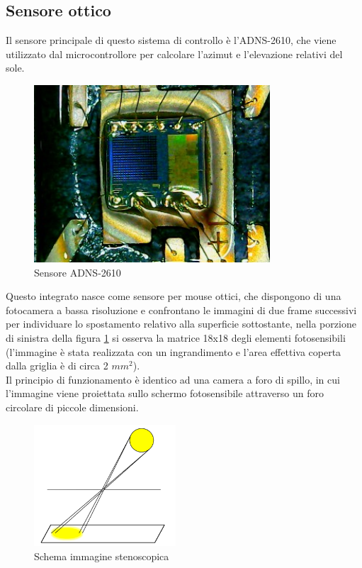 \documentclass[12pt]{article}
\begin{document}
    
    \subsection{Sensore ottico}\label{optical_sensor}
    Il sensore principale di questo sistema di controllo è l'ADNS-2610, che viene utilizzato dal microcontrollore per calcolare l'azimut e l'elevazione relativi del sole.\\
    
    \begin{figure}[h]
        \centering
        \includegraphics[width=250pt]{Draws/ADNS-2610_die/WIN_20210501_17_42_53_Pro.jpg}
        \caption{Sensore ADNS-2610}
        \label{fig:ADNS2610_die}
    \end{figure}
   
   
    Questo integrato nasce come sensore per mouse ottici, che dispongono di una fotocamera a bassa risoluzione e confrontano le immagini di due frame successivi per individuare lo spostamento relativo alla superficie sottostante, nella porzione di sinistra della figura \ref{fig:ADNS2610_die} si osserva la matrice 18x18 degli elementi fotosensibili (l'immagine è stata realizzata con un ingrandimento e l'area effettiva coperta dalla griglia è di circa 2 $mm^2$).\\
    Il principio di funzionamento è identico ad una camera a foro di spillo, in cui l'immagine viene proiettata sullo schermo fotosensibile attraverso un foro circolare di piccole dimensioni.
    
    \begin{figure}[h]
        \centering
        \includegraphics[width=150pt]{Draws/Pinhole_sun}
        \caption{Schema immagine stenoscopica}
        \label{fig:pinhole_sun}
    \end{figure}
    
\end{document}
